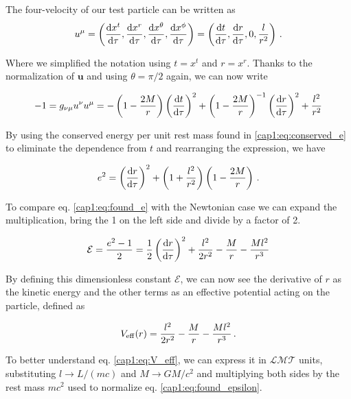 The four-velocity of our test particle can be written as
\begin{equation*}
    u^\mu
    = \left(\dv{x^t}{\tau}, \dv{x^r}{\tau}, \dv{x^\theta}{\tau}, \dv{x^\phi}{\tau} \right)
    = \left(\dv{t}{\tau}, \dv{r}{\tau}, 0, \frac{l}{r^2} \right) \, .
\end{equation*}

Where we simplified the notation using $t = x^t$ and $r = x^r$.
Thanks to the normalization of $\mathbf u$ and using $\theta = \pi / 2$ again,
we can now write

\begin{equation*}
    - 1 = g_{\nu \mu} u^\nu u^\mu =
    - \left(1 - \frac{2M}{r} \right) \left(\dv{t}{\tau} \right)^2
    + \left(1 - \frac{2M}{r} \right)^{- 1} \left(\dv{r}{\tau} \right)^2
    + \frac{l^2}{r^2}
\end{equation*}

By using the conserved energy per unit rest mass found in \ref{cap1:eq:conserved_e} to
eliminate the dependence from $t$ and rearranging the expression, we have

\begin{equation}
    e^2 = \left(\dv{r}{\tau}\right)^2 + \left(1 + \frac{l^2}{r^2}\right)
    \left(1 - \frac{2M}{r} \right) \, .
   \label{cap1:eq:found_e}
\end{equation}

To compare eq. \ref{cap1:eq:found_e} with the Newtonian case we can expand
the multiplication, bring the 1 on the left side and divide by a factor of 2.

\begin{equation}
    \mathcal E = \frac{e^2 - 1}{2} = \frac{1}{2} \left(\dv{r}{\tau}\right)^2
    + \frac{l^2}{2 r^2} - \frac{M}{r} - \frac{M l^2}{r^3}
    \label{cap1:eq:found_epsilon}
\end{equation}

By defining this dimensionless constant $\mathcal E$, we can now see the
derivative of $r$ as the kinetic energy and the other terms as an effective
potential acting on the particle, defined as

\begin{equation}
    V_{\rm eff}(r) = \frac{l^2}{2 r^2} - \frac{M}{r} - \frac{M l^2}{r^3} \, .
    \label{cap1:eq:V_eff}
\end{equation}

To better understand eq. \ref{cap1:eq:V_eff}, we can express it in
$\mathcal{LMT}$ units, substituting
$l \rightarrow L / (m c)$ and $ M \rightarrow G M / c^2$ and multiplying both
sides by the rest mass $m c^2$ used to normalize eq. \ref{cap1:eq:found_epsilon}.


